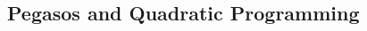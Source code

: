 \documentclass{article}
\begin{document}
\begin{multicols}{2}
\subsection{Pegasos and Quadratic Programming}













\end{multicols}
\end{document}
